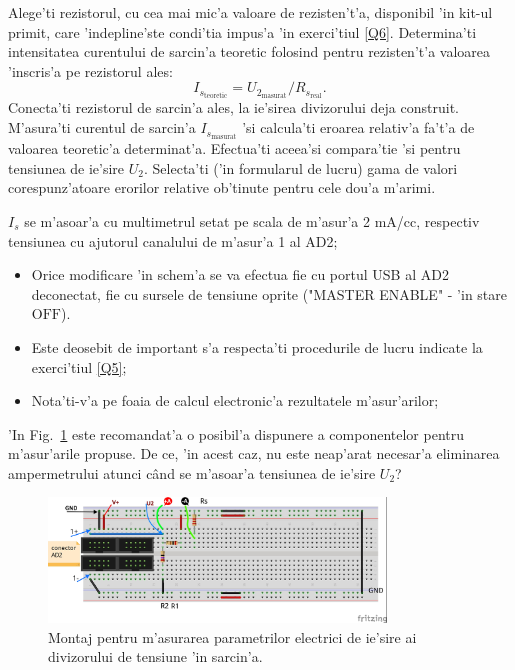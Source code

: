 %
%
\begin{exercise} \label{Q7} %
	Alege'ti rezistorul, cu cea mai mic'a valoare de rezisten't'a, disponibil 'in kit-ul primit, care 'indepline'ste condi'tia impus'a 'in exerci'tiul \eqref{Q6}. Determina'ti intensitatea curentului de sarcin'a teoretic folosind pentru rezisten't'a valoarea 'inscris'a pe rezistorul ales:
\begin{equation} \label{is_teoretic}
	I_{s_{\mathrm{teoretic}}} = U_{2_{\mathrm{masurat}}} / R_{s_{\mathrm{real}}}.
\end{equation}
	Conecta'ti rezistorul de sarcin'a ales, la ie'sirea divizorului deja construit.  M'asura'ti curentul de sarcin'a $I_{s_{\mathrm{masurat}}}$ 'si calcula'ti eroarea relativ'a fa't'a de valoarea teoretic'a determinat'a. Efectua'ti aceea'si compara'tie 'si pentru tensiunea de ie'sire $U_2$. Selecta'ti ('in formularul de lucru) gama de valori corespunz'atoare erorilor relative ob'tinute pentru cele dou'a m'arimi.	
\end{exercise}
%
\begin{observ}
$I_s$ se m'asoar'a cu multimetrul setat pe scala de m'asur'a 2 mA/cc, respectiv tensiunea cu ajutorul canalului de m'asur'a 1 al AD2;
\begin{itemize}
	\item 	{\color{blue}
		Orice modificare 'in schem'a se va efectua fie cu portul USB al AD2 deconectat, fie cu sursele de tensiune oprite 
		("MASTER ENABLE" - 'in stare $\mathrm{OFF}$).}
\item {\color{blue} Este deosebit de important s'a respecta'ti procedurile de lucru indicate la exerci'tiul \ref{Q5}; }  
\item Nota'ti-v'a pe foaia de calcul electronic'a rezultatele m'asur'arilor;
\end{itemize}
\end{observ}
%
\begin{indicatie}
'In Fig.~\ref{fig:4_divizor_sarcina} este recomandat'a o posibil'a dispunere a componentelor pentru m'asur'arile propuse. {\color{blue} De ce, 'in acest caz, nu este neap'arat necesar'a eliminarea ampermetrului atunci c\^and se m'asoar'a tensiunea de ie'sire $U_2$?}
\end{indicatie}
%
\begin{figure}
	\centering
		\includegraphics[width=0.8\textwidth]{laborator_01/figuri/4_divizor_sarcina_bb}
	\caption{Montaj pentru m'asurarea parametrilor electrici de ie'sire ai divizorului de tensiune 'in sarcin'a.}
	\label{fig:4_divizor_sarcina}
\end{figure}
